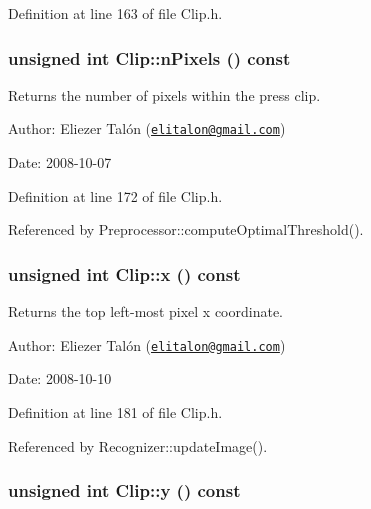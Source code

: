 Definition at line 163 of file Clip.h.\hypertarget{class_clip_23ad153e40b62cc9178ff6b439ad7d92}{
\subsubsection[nPixels]{\setlength{\rightskip}{0pt plus 5cm}unsigned int Clip::nPixels () const}}
\label{class_clip_23ad153e40b62cc9178ff6b439ad7d92}


Returns the number of pixels within the press clip. 

\begin{Desc}
\item[Author:]Eliezer Talón (\href{mailto:elitalon@gmail.com}{\tt elitalon@gmail.com}) \end{Desc}
\begin{Desc}
\item[Date:]2008-10-07 \end{Desc}


Definition at line 172 of file Clip.h.

Referenced by Preprocessor::computeOptimalThreshold().\hypertarget{class_clip_de984337b7b13fb63a3d3b1797b544c8}{
\subsubsection[x]{\setlength{\rightskip}{0pt plus 5cm}unsigned int Clip::x () const}}
\label{class_clip_de984337b7b13fb63a3d3b1797b544c8}


Returns the top left-most pixel x coordinate. 

\begin{Desc}
\item[Author:]Eliezer Talón (\href{mailto:elitalon@gmail.com}{\tt elitalon@gmail.com}) \end{Desc}
\begin{Desc}
\item[Date:]2008-10-10 \end{Desc}


Definition at line 181 of file Clip.h.

Referenced by Recognizer::updateImage().\hypertarget{class_clip_998a62506ffab457184ec7083cb154e4}{
\subsubsection[y]{\setlength{\rightskip}{0pt plus 5cm}unsigned int Clip::y () const}}
\label{class_clip_998a62506ffab457184ec7083cb154e4}


